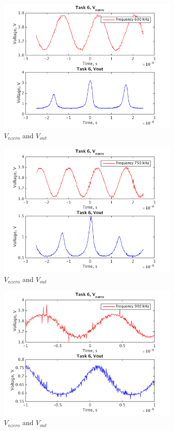 \documentclass[a4paper,english,11pt]{article}
\begin{document}
\begin{figure}[H]
 \centering
  \includegraphics[width=0.8\textwidth]{img/task6_b_3.png}
  \caption{ $V_{nzero}$ and  $V_{out}$}
  \label{freq3}	
\end{figure}

\begin{figure}[H]
 \centering
  \includegraphics[width=0.8\textwidth]{img/task6_b_4.png}
  \caption{ $V_{nzero}$ and  $V_{out}$}
  \label{freq4}	
\end{figure}

\begin{figure}[H]
 \centering
  \includegraphics[width=0.8\textwidth]{img/task6_b_5.png}
  \caption{ $V_{nzero}$ and  $V_{out}$}
  \label{freq5}	
\end{figure}
\end{document}
